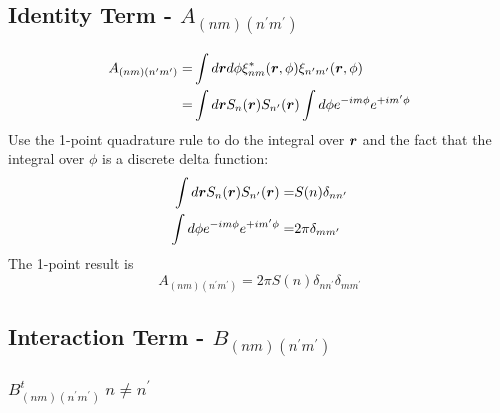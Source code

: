 \documentclass [10pt,letterpaper]{article}
\begin{document}
\subsection{Identity Term - $A_{(n m)(n^\prime m^\prime)}$ }
\label{sub:identity-term-Anmnpmp}
\begin{equation} \label{eq:der-calculate-Anmnpmp}
	\begin{split}
		A_{(n m)(n^\prime m^\prime)}
		=&
		\int d\vectorsym{r} d\phi
		\xi^*_{n m}
		(\vectorsym{r},\phi)
		\xi_{n^\prime m^\prime}
		(\vectorsym{r},\phi) 
		\\
		=&
		\int d\vectorsym{r}
		S_n(\vectorsym{r})
		S_{n^\prime}(\vectorsym{r})
		\int d\phi
		e^{-i m \phi}
		e^{+i m^\prime \phi} 
	\end{split}
\end{equation}
Use the 1-point quadrature rule to do the integral over $\vectorsym{r}$ and the fact that the integral over $\phi$ is a discrete delta function:
\begin{align*}
	\int d\vectorsym{r}
	S_n(\vectorsym{r})
	S_{n^\prime}(\vectorsym{r})
	=&
	S(n)
	\delta_{n n^\prime}
	\\
	\int d\phi
	e^{-i m \phi}
	e^{+i m^\prime \phi}
	=&
	2\pi
	\delta_{m m^\prime}
\end{align*}
The 1-point result is
\begin{equation} \label{eq:result-Anmnpmp-1pt}
	A_{(n m)(n^\prime m^\prime)}
	=
	2\pi S(n)
	\delta_{n n^\prime}
	\delta_{m m^\prime}
\end{equation}
\subsection{Interaction Term - $B_{(n m)(n^\prime m^\prime)}$}
\label{sub:interaction-term-Bnmnpmp}
\subsubsection{$B^t_{(n m)(n^\prime m^\prime)} \ n\neq n^\prime$}
\label{subsub:Btnmnpmp-off-diagonal}
\end{document}
